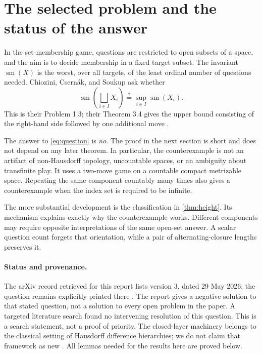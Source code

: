 \documentclass[11pt,letterpaper]{article}
\numberwithin{equation}{section}
\theoremstyle{definition}
\theoremstyle{remark}
\theoremstyle{definition}
\newcommand{\sm}{\operatorname{sm}}
\newcommand{\bigsqsum}{\bigsqcup}
\begin{document}
\setcounter{tocdepth}{1}
{\small\setlength{\parskip}{0pt}\tableofcontents}
\newpage
{}

\section{The selected problem and the status of the answer}

In the set-membership game, questions are restricted to open subsets of a space,
and the aim is to decide membership in a fixed target subset. The invariant
$\sm(X)$ is the worst, over all targets, of the least ordinal number of questions
needed. Chiozini, Csern\'ak, and Soukup ask whether
\begin{equation}\label{eq:question}
 \sm\!\left(\bigsqsum_{i\in I}X_i\right)
 \stackrel{?}{=}\sup_{i\in I}\sm(X_i).
\end{equation}
This is their Problem 1.3; their Theorem 3.4 gives the upper bound consisting of
the right-hand side followed by one additional move \cite{CCS}.

The answer to \eqref{eq:question} is \emph{no}. The proof in the next section is
short and does not depend on any later theorem. In particular, the counterexample
is not an artifact of non-Hausdorff topology, uncountable spaces, or an ambiguity
about transfinite play. It uses a two-move game on a countable compact metrizable
space. Repeating the same component countably many times also gives a
counterexample when the index set is required to be infinite.

The more substantial development is the classification in
\cref{thm:height}. Its mechanism explains exactly why the counterexample works.
Different components may require opposite interpretations of the same
open-set answer. A scalar question count forgets that orientation, while a pair
of alternating-closure lengths preserves it.

\paragraph{Status and provenance.}
The arXiv record retrieved for this report lists version 3, dated 29 May 2026;
the question remains explicitly printed there \cite{CCS}. The report gives a
negative solution to that stated question, not a solution to every open problem
in the paper. A targeted literature search found no intervening resolution of
this question. This is a search statement, not a proof of priority. The
closed-layer machinery belongs to the classical setting of Hausdorff difference
hierarchies; we do not claim that framework as new \cite{BGKS}. All lemmas needed
for the results here are proved below.
\end{document}
